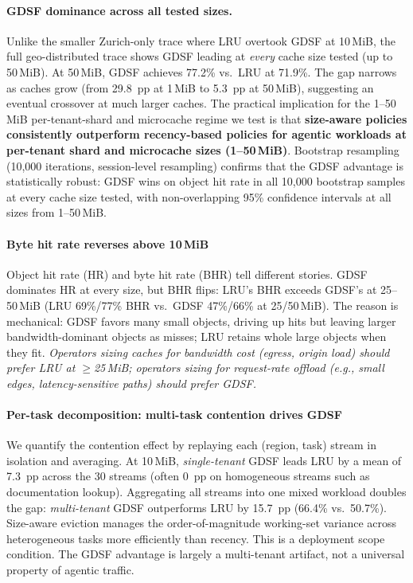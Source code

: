 \documentclass[10pt,sigconf,letterpaper,anonymous,nonacm]{acmart}
\begin{document}
\paragraph{GDSF dominance across all tested sizes.}
Unlike the smaller Zurich-only trace where LRU overtook GDSF at 10\,MiB,
the full geo-distributed trace shows GDSF leading at \emph{every} cache
size tested (up to 50\,MiB).  At 50\,MiB, GDSF achieves 77.2\% vs.\
LRU at 71.9\%.  The gap narrows as caches grow (from 29.8~pp at 1\,MiB
to 5.3~pp at 50\,MiB), suggesting an eventual crossover at much larger
caches.  The practical implication for the 1--50\,MiB per-tenant-shard
and microcache regime we test is that \textbf{size-aware policies
consistently outperform recency-based policies for agentic workloads
at per-tenant shard and microcache sizes (1--50\,MiB)}.
Bootstrap resampling (10{,}000 iterations, session-level resampling)
confirms that the GDSF advantage is statistically robust:
GDSF wins on object hit rate in all 10{,}000 bootstrap samples at every cache size tested,
with non-overlapping 95\% confidence intervals at all sizes from
1--50\,MiB.

\paragraph{Byte hit rate reverses above 10\,MiB}
Object hit rate (HR) and byte hit rate (BHR) tell different stories.
GDSF dominates HR at every size, but BHR flips: LRU's BHR exceeds
GDSF's at 25--50\,MiB (LRU 69\%/77\% BHR vs.\ GDSF 47\%/66\% at
25/50\,MiB).  The reason is mechanical: GDSF favors many small objects,
driving up hits but leaving larger bandwidth-dominant objects as misses;
LRU retains whole large objects when they fit.  \emph{Operators sizing
caches for bandwidth cost (egress, origin load) should prefer LRU at
$\geq$25\,MiB; operators sizing for request-rate offload (e.g., small
edges, latency-sensitive paths) should prefer GDSF.}

\paragraph{Per-task decomposition: multi-task contention drives GDSF}
We quantify the contention effect by replaying each (region, task)
stream in isolation and averaging.  At 10\,MiB, \emph{single-tenant}
GDSF leads LRU by a mean of 7.3~pp across the 30 streams (often 0~pp
on homogeneous streams such as documentation lookup).  Aggregating
all streams into one mixed workload doubles the gap: \emph{multi-tenant}
GDSF outperforms LRU by 15.7~pp (66.4\% vs.\ 50.7\%).  Size-aware eviction
manages the order-of-magnitude working-set variance across heterogeneous
tasks more efficiently than recency.  This is a deployment scope
condition. The GDSF advantage is largely a multi-tenant artifact, not
a universal property of agentic traffic.
\end{document}
